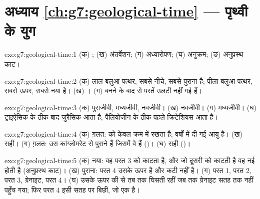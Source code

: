 \section*{अध्याय \ref{ch:g7:geological-time} --- पृथ्वी के युग}

\begin{solution}{exo:g7:geological-time:1}
(क) ; (ख) अंतर्वेशन; (ग) अध्यारोपण; (घ) 
अनुक्रम; (ङ) अनुप्रस्थ काट।
\end{solution}

\begin{solution}{exo:g7:geological-time:2}
(क) लाल बलुआ पत्थर, सबसे नीचे, सबसे पुराना है; पीला बलुआ पत्थर, सबसे ऊपर, सबसे
नया है। (ख) । (ग) बनने के बाद से परतें उलटी नहीं
गई हैं।
\end{solution}

\begin{solution}{exo:g7:geological-time:3}
(क) पुराजीवी, मध्यजीवी, नवजीवी। (ख) नवजीवी। (ग) मध्यजीवी। (घ) ट्राइऐसिक के ठीक
बाद जुरैसिक आता है; पैलियोजीन के ठीक पहले क्रिटेशियस
आता है।
\end{solution}

\begin{solution}{exo:g7:geological-time:4}
(क) ग़लत:   को केवल क्रम में रखता है; वर्षों में दी गई
आयु  है। (ख) सही। (ग) ग़लत:  उस कांग्लोमरेट से पुराने हैं जिसमें
वे हैं ()। (घ) सही ()।
\end{solution}

\begin{solution}{exo:g7:geological-time:5}
(क) नया: वह परत 3 को काटता है, और जो  दूसरी को काटती है वह नई होती है
(अनुप्रस्थ काट)। (ख) पुराना: परत 4 उसके ऊपर है और कटी नहीं है। (ग) परत 1,
परत 2, परत 3, ग्रेनाइट, परत 4। (घ) उसके ऊपर की   से तब तक घिसती रहीं
जब तक ग्रेनाइट सतह तक नहीं पहुँच गया; फिर परत 4 इसी  सतह पर बिछी, जो एक
 है।
\end{solution}

